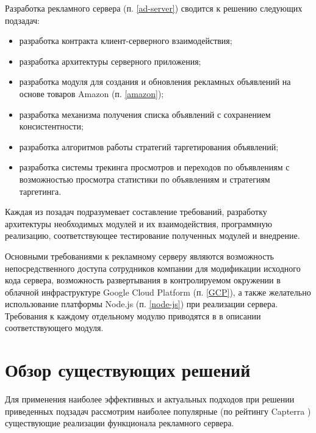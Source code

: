 \documentclass[specification,annotation,times]{itmo-student-thesis}
\begin{document}
Разработка рекламного сервера (п. \ref{ad-server}) сводится к решению следующих подзадач:
\begin{itemize}
\item разработка контракта клиент-серверного взаимодействия;
\item разработка архитектуры серверного приложения;
\item разработка модуля для создания и обновления рекламных объявлений на основе товаров Amazon (п. \ref{amazon});
\item разработка механизма получения списка объявлений с сохранением консистентности;
\item разработка алгоритмов работы стратегий таргетирования объявлений;
\item разработка системы трекинга просмотров и переходов по объявлениям с возможностью просмотра статистики по объявлениям и стратегиям таргетинга.
\end{itemize}

Каждая из позадач подразумевает составление требований, разработку архитектуры необходимых модулей и их взаимодействия, программную реализацию, соответствующее тестирование полученных модулей и внедрение. 

Основными требованиями к рекламному серверу являются возможность непосредственного доступа сотрудников компании для модификации исходного кода сервера, возможность развертывания в контролируемом окружении в облачной инфраструктуре Google Cloud Platform (п. \ref{GCP}), а также желательно использование платформы Node.js (п. \ref{node-js}) при реализации сервера. Требования к каждому отдельному модулю приводятся в в описании соответствующего модуля.

\section{Обзор существующих решений\label{sec:review}}

Для применения наиболее эффективных и актуальных подходов при решении приведенных подзадач рассмотрим наиболее популярные (по рейтингу Capterra \cite{capterra}) существующие реализации функционала рекламного сервера.
\end{document}
